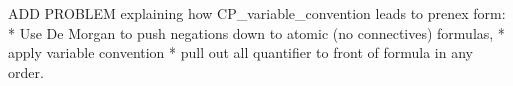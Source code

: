 \documentclass[handout]{mcs}
\begin{document}
\renewcommand{\reading}{
\begin{itemize}
 \item Chapter~\bref{prop_algebra_sec}{.\ \emph{The Algebra of Propositions}}
  through~\bref{SAT_sec},
\item Chapter~\bref{predicate_sec}{.\ \emph{Predicate Formulas}}.
\end{itemize}}







\begin{staffnotes}
ADD PROBLEM explaining how CP\_variable\_convention leads to prenex
form:
* Use De Morgan to push negations down to atomic (no connectives) formulas,
* apply variable convention
* pull out all quantifier to front of formula in any order.
\end{staffnotes}






\end{document}
